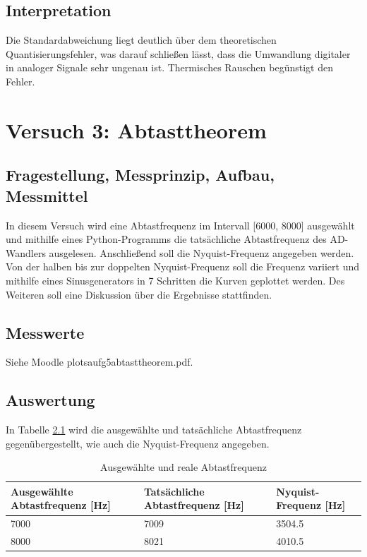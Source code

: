 \documentclass[12pt, oneside, a4paper, \docLanguage]{report}
\begin{document}
\section{Interpretation}
\label{chap:VERSUCH_2_INTERPRETATION}
Die Standardabweichung liegt deutlich über dem theoretischen Quantisierungsfehler, was darauf schließen lässt, dass die Umwandlung digitaler in analoger Signale sehr ungenau ist. Thermisches Rauschen begünstigt den Fehler.

%
%
\chapter{Versuch 3: Abtasttheorem}
\label{chap:VERSUCH_3}

\section{Fragestellung, Messprinzip, Aufbau, Messmittel}
\label{chap:VERSUCH_3_FRAGESTELLUNG}
In diesem Versuch wird eine Abtastfrequenz im Intervall [6000, 8000] ausgewählt und mithilfe eines Python-Programms die tatsächliche Abtastfrequenz des AD-Wandlers ausgelesen. Anschließend soll die Nyquist-Frequenz angegeben werden. Von der halben bis zur doppelten Nyquist-Frequenz soll die Frequenz variiert und mithilfe eines Sinusgenerators in 7 Schritten die Kurven geplottet werden. Des Weiteren soll eine Diskussion über die Ergebnisse stattfinden.

\section{Messwerte}
\label{chap:VERSUCH_3_MESSWERTE}
Siehe Moodle plots\textunderscore aufg5\textunderscore abtasttheorem.pdf.

\section{Auswertung}
\label{chap:VERSUCH_3_AUSWERTUNG}
In Tabelle \ref{fig:VERSUCH_3_auswertung} wird die ausgewählte und tatsächliche Abtastfrequenz gegenübergestellt, wie auch die Nyquist-Frequenz angegeben.

\begin{table}[H]
\centering
\begin{tabular}{|l|l|l|}
\hline
\textbf{Ausgewählte Abtastfrequenz {[}Hz{]}} & \textbf{Tatsächliche Abtastfrequenz {[}Hz{]}} & \textbf{Nyquist-Frequenz {[}Hz{]}} \\ \hline
7000                         & 7009                        & 3504.5                 \\ \hline
8000                         & 8021                        & 4010.5 \\ \hline
\end{tabular}
\caption{Ausgewählte und reale Abtastfrequenz}
\label{fig:VERSUCH_3_auswertung}
\end{table}                   
\end{document}
